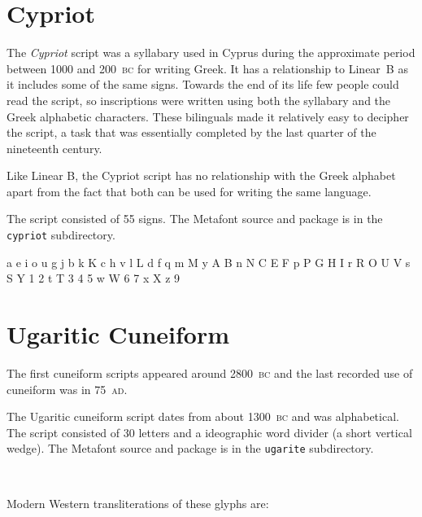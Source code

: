 \documentclass{article}
\newcommand{\BC}{\textsc{bc}}
\newcommand{\AD}{\textsc{ad}}
\begin{document}
\section{Cypriot}

    The \textit{Cypriot} script was a syllabary used in Cyprus during the
approximate period between 1000 and 200~\BC{} for writing Greek. It has a 
relationship to Linear~B as it includes some of the same signs. Towards
the end of its life few people could read the script, so inscriptions
were written using both the syllabary and the Greek alphabetic characters.
These bilinguals made it relatively easy to decipher the script, a task that
was essentially completed by the last quarter of the nineteenth century.

    Like Linear B, the Cypriot script has no relationship with the Greek
alphabet apart from the fact that both can be used for writing the same
language.

    The script consisted of 55 signs. The Metafont source and package is
in the \texttt{cypriot} subdirectory.

\begin{center}
\renewcommand{\baselinestretch}{1.2}
\cyprfamily
a e i o u
g
j b
k K c h v
l L d f q
m M y A B
n N C E F
p P G H I
r R O U V
s S Y 1 2
t T 3 4 5
w W 6 7
x X z
9

\end{center}

\section{Ugaritic Cuneiform}

    The first cuneiform scripts appeared around 2800~\BC{} and the last 
recorded use of cuneiform was in 75~\AD.

    The Ugaritic cuneiform script dates from about 1300~\BC{} and
was alphabetical. The script consisted of 30 letters and a ideographic word
divider (a short vertical wedge). The Metafont source and package
is in the \texttt{ugarite} subdirectory.

\begin{center}
\cugarfamily
\Ua\ \Ub\ \Ug\ \Uhu\ \Ud\ 
\Uh\ \Uw\ \Uz\ \Uhd\ \Utd\ 
\Uy\ \Uk\ \Usa\ \Ul\ \Um\ 
\Udb\ \Un\ \Uzd\ \Us\ \Ulq\ 
\Up\ \Usd\ \Uq\ \Ur\ \Utb\ 
\Ugd\ \Ut\ \Ui\ \Uu\ \Usg\ 
\Uwd
\end{center}

    Modern Western transliterations of these glyphs are:
\begin{center}
\translitcugar{%
\Ua\ \Ub\ \Ug\ \Uhu\ \Ud\ 
\Uh\ \Uw\ \Uz\ \Uhd\ \Utd\ 
\Uy\ \Uk\ \Usa\ \Ul\ \Um\ 
\Udb\ \Un\ \Uzd\ \Us\ \Ulq\ 
\Up\ \Usd\ \Uq\ \Ur\ \Utb\ 
\Ugd\ \Ut\ \Ui\ \Uu\ \Usg\ 
\Uwd}
\end{center}
\end{document}
